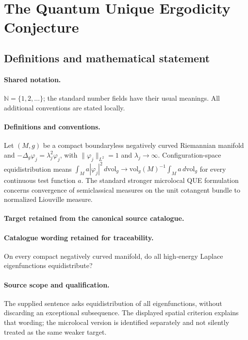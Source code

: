 \documentclass[11pt]{article}
\begin{document}
\section{The Quantum Unique Ergodicity Conjecture}\label{statement}

\subsection{Definitions and mathematical statement}

\paragraph{Shared notation.}$\mathbb N=\{1,2,\ldots\}$; the standard number fields have their usual meanings. All additional conventions are stated locally.


\paragraph{Definitions and conventions.}
Let $(M,g)$ be a compact boundaryless negatively curved Riemannian manifold and $-\Delta_g\varphi_j=\lambda_j^2\varphi_j$, with $\|\varphi_j\|_{L^2}=1$ and $\lambda_j\to\infty$. Configuration-space equidistribution means $\int_M a|\varphi_j|^2\,d\mathrm{vol}_g\to \mathrm{vol}_g(M)^{-1}\int_M a\,d\mathrm{vol}_g$ for every continuous test function $a$. The standard stronger microlocal QUE formulation concerns convergence of semiclassical measures on the unit cotangent bundle to normalized Liouville measure.

\paragraph{Target retained from the canonical source catalogue.}
\paragraph{Catalogue wording retained for traceability.}
On every compact negatively curved manifold, do all high-energy Laplace eigenfunctions equidistribute?

\paragraph{Source scope and qualification.}
The supplied sentence asks equidistribution of all eigenfunctions, without discarding an exceptional subsequence. The displayed spatial criterion explains that wording; the microlocal version is identified separately and not silently treated as the same weaker target.
\end{document}
